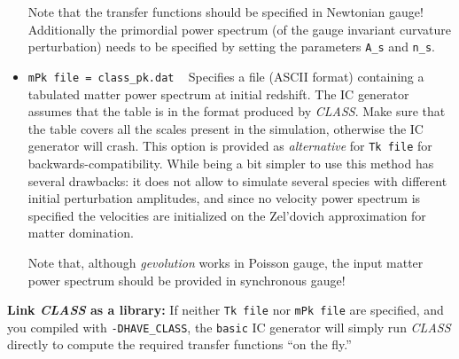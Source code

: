 \documentclass[a4paper,10pt]{article}
\begin{document}
\begin{itemize}
 Note that the transfer functions should be specified in Newtonian gauge! Additionally the primordial power spectrum (of the gauge invariant
 curvature perturbation) needs to be specified by setting the parameters \texttt{A\_s} and \texttt{n\_s}.
 \item[] \hspace{-25pt}\texttt{mPk file = class\_pk.dat} ~ Specifies a file (ASCII format) containing a tabulated matter power spectrum at
 initial redshift. The IC generator assumes that the table is in the format produced by \textit{CLASS}. Make sure that the table covers all
 the scales present in the simulation, otherwise the IC generator will crash. This option is provided as \textit{alternative} for
 \texttt{Tk file} for backwards-compatibility. While being a bit simpler to use this method has several drawbacks: it does not allow to
 simulate several species with different initial perturbation amplitudes, and since no velocity power spectrum is specified the velocities
 are initialized on the Zel'dovich approximation for matter domination.
 
 Note that, although \textit{gevolution} works in Poisson gauge, the input matter power spectrum should be provided in synchronous gauge!
\end{itemize}
\noindent\textbf{Link \textit{CLASS} as a library:} If neither \texttt{Tk file} nor \texttt{mPk file} are specified, and you compiled with
\mbox{\texttt{-DHAVE\_CLASS}}, the \texttt{basic} IC generator will simply run \textit{CLASS} directly to compute the required transfer
functions ``on the fly.''
\end{document}
